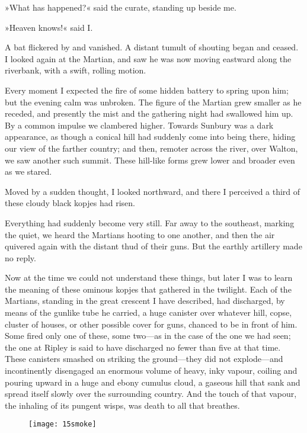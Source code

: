 »What has happened?« said the curate, standing up beside me.

»Heaven knows!« said I.

A bat flickered by and vanished. A distant tumult of shouting began and ceased. I looked again at the Martian, and saw he was now moving eastward along the riverbank, with a swift, rolling motion.

Every moment I expected the fire of some hidden battery to spring upon him; but the evening calm was unbroken. The figure of the Martian grew smaller as he receded, and presently the mist and the gathering night had swallowed him up. By a common impulse we clambered higher. Towards Sunbury was a dark appearance, as though a conical hill had suddenly come into being there, hiding our view of the farther country; and then, remoter across the river, over Walton, we saw another such summit. These hill-like forms grew lower and broader even as we stared.

Moved by a sudden thought, I looked northward, and there I perceived a third of these cloudy black kopjes had risen.

Everything had suddenly become very still. Far away to the southeast, marking the quiet, we heard the Martians hooting to one another, and then the air quivered again with the distant thud of their guns. But the earthly artillery made no reply.

Now at the time we could not understand these things, but later I was to learn the meaning of these ominous kopjes that gathered in the twilight. Each of the Martians, standing in the great crescent I have described, had discharged, by means of the gunlike tube he carried, a huge canister over whatever hill, copse, cluster of houses, or other possible cover for guns, chanced to be in front of him. Some fired only one of these, some two—as in the case of the one we had seen; the one at Ripley is said to have discharged no fewer than five at that time. These canisters smashed on striking the ground—they did not explode—and incontinently disengaged an enormous volume of heavy, inky vapour, coiling and pouring upward in a huge and ebony cumulus cloud, a gaseous hill that sank and spread itself slowly over the surrounding country. And the touch of that vapour, the inhaling of its pungent wisps, was death to all that breathes.

\begin{figure}[tb!]
\centering
\texttt{[image: 15smoke]}
\end{figure}

